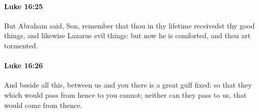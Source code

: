 		\paragraph{Luke 16:25} %
			\label{LUKE-16-25}

			But Abraham said, Son, remember that thou in thy lifetime receivedst thy good things, and likewise Lazarus evil things: but now he is comforted, and thou art tormented.

			\begin{framed}
			\scriptsize
				\begin{compactdesc}
					\item[SBLG] 
				\end{compactdesc}
			\end{framed}

		\paragraph{Luke 16:26} %
			\label{LUKE-16-26}

			And beside all this, between us and you there is a great gulf fixed: so that they which would pass from hence to you cannot; neither can they pass to us, that would come from thence.

